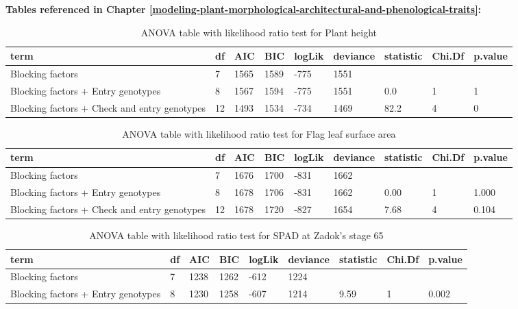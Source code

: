 \documentclass[12pt,oneside]{dukestatscithesis} %
\theoremstyle{definition}
\theoremstyle{definition}
\theoremstyle{definition}
\theoremstyle{remark}
\begin{document}
\textbf{Tables referenced in Chapter
\ref{modeling-plant-morphological-architectural-and-phenological-traits}:}
\begin{table}[H]

\caption{\label{tab:unnamed-chunk-5}\label{tab:lrt-plht}ANOVA table with likelihood ratio test for Plant height}
\centering
\begin{tabular}[t]{>{\raggedright\arraybackslash}p{3.5cm}llllllll}
\toprule
term & df & AIC & BIC & logLik & deviance & statistic & Chi.Df & p.value\\
\midrule
Blocking factors & 7 & 1565 & 1589 & -775 & 1551 &  &  & \\
Blocking factors + Entry genotypes & 8 & 1567 & 1594 & -775 & 1551 & 0.0 & 1 & 1\\
Blocking factors + Check and entry genotypes & 12 & 1493 & 1534 & -734 & 1469 & 82.2 & 4 & 0\\
\bottomrule
\end{tabular}
\end{table}\begin{table}[H]
\caption{\label{tab:unnamed-chunk-5}\label{tab:lrt-lar}ANOVA table with likelihood ratio test for Flag leaf surface area}
\centering
\begin{tabular}[t]{>{\raggedright\arraybackslash}p{3.5cm}llllllll}
\toprule
term & df & AIC & BIC & logLik & deviance & statistic & Chi.Df & p.value\\
\midrule
Blocking factors & 7 & 1676 & 1700 & -831 & 1662 &  &  & \\
Blocking factors + Entry genotypes & 8 & 1678 & 1706 & -831 & 1662 & 0.00 & 1 & 1.000\\
Blocking factors + Check and entry genotypes & 12 & 1678 & 1720 & -827 & 1654 & 7.68 & 4 & 0.104\\
\bottomrule
\end{tabular}
\end{table}\begin{table}[H]
\caption{\label{tab:unnamed-chunk-5}\label{tab:lrt-spadi}ANOVA table with likelihood ratio test for SPAD at Zadok's stage 65}
\centering
\begin{tabular}[t]{>{\raggedright\arraybackslash}p{3.5cm}llllllll}
\toprule
term & df & AIC & BIC & logLik & deviance & statistic & Chi.Df & p.value\\
\midrule
Blocking factors & 7 & 1238 & 1262 & -612 & 1224 &  &  & \\
Blocking factors + Entry genotypes & 8 & 1230 & 1258 & -607 & 1214 & 9.59 & 1 & 0.002\\

\end{tabular}
\end{table}
\end{document}

